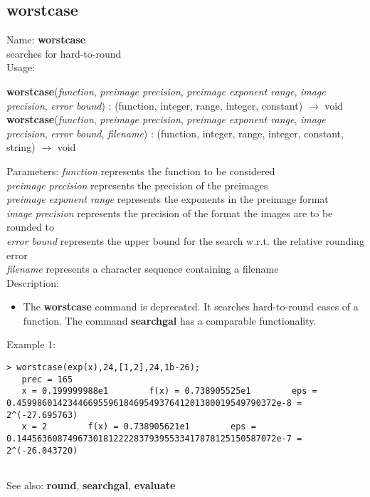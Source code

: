 \subsection{ worstcase }
\noindent Name: \textbf{worstcase}\\
searches for hard-to-round\\

\noindent Usage: 
\begin{center}
\textbf{worstcase}(\emph{function}, \emph{preimage precision}, \emph{preimage exponent range}, \emph{image precision}, \emph{error bound}) : (\textsf{function}, \textsf{integer}, \textsf{range}, \textsf{integer}, \textsf{constant}) $\rightarrow$ \textsf{void}\\
\textbf{worstcase}(\emph{function}, \emph{preimage precision}, \emph{preimage exponent range}, \emph{image precision}, \emph{error bound}, \emph{filename}) : (\textsf{function}, \textsf{integer}, \textsf{range}, \textsf{integer}, \textsf{constant}, \textsf{string}) $\rightarrow$ \textsf{void}\\
\end{center}
Parameters: 
\emph{function} represents the function to be considered\\
\emph{preimage precision} represents the precision of the preimages\\
\emph{preimage exponent range} represents the exponents in the preimage format\\
\emph{image precision} represents the precision of the format the images are to be rounded to\\
\emph{error bound} represents the upper bound for the search w.r.t. the relative rounding error\\
\emph{filename} represents a character sequence containing a filename\\

\noindent Description: \begin{itemize}

\item The \textbf{worstcase} command is deprecated. It searches hard-to-round cases of
   a function. The command \textbf{searchgal} has a comparable functionality.
\end{itemize}
\noindent Example 1: 
\begin{center}\begin{minipage}{14.8cm}\begin{Verbatim}[frame=single]
   > worstcase(exp(x),24,[1,2],24,1b-26);
   prec = 165
   x = 0.199999988e1		f(x) = 0.738905525e1		eps = 0.459986014234466955961846954937641201380019549790372e-8 = 2^(-27.695763) 
   x = 2		f(x) = 0.738905621e1		eps = 0.144563608749673018122228379395533417878125150587072e-7 = 2^(-26.043720) 
   
\end{Verbatim}
\end{minipage}\end{center}
See also: \textbf{round}, \textbf{searchgal}, \textbf{evaluate}
